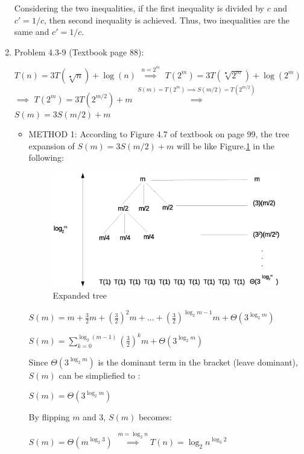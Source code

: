\documentclass[11pt]{article}
\begin{document}
\begin{enumerate}
	Considering the two inequalities, if the first inequality is divided by $c$ and $c{'} = 1/c$, then second inequality is achieved. Thus, two inequalities are the same and $c{'} = 1/c$.  





\pagebreak

\item Problem 4.3-9 (Textbook page 88):
	
	$ T(n) = 3T(\sqrt[•]{n}) + \log(n) $ 
	$ \overset{n=2^m}{\implies} $ 
	$ T(2^m) = 3T(\sqrt[•]{2^m}) + \log(2^m) $ 
	$ \implies $ 
	$T(2^m) = 3T(2^{m/2}) + m $ 
	$ \overset{S(m)=T(2^m) \implies S(m/2)=T(2^{m/2})}{\implies} $ 
	$ S(m) = 3S(m/2) + m$ 
	
	
	\begin{itemize}
    	\item METHOD 1:
     	According to Figure 4.7 of textbook on page 99, the tree expansion of $ S(m) = 3S(m/2) + m$ will be like Figure.\ref{fig:prob2} in the following:
     	
		\begin{figure}[h!]
			\centerline{\includegraphics[width=5in]{prob2.eps}}
			\caption{Expanded tree}
			\label{fig:prob2}
		\end{figure}
	
		$S(m) = m+\frac{3}{2}m+{(\frac{3}{2})}^2m+...+{(\frac{3}{2})}^{\log_2{m-1}}m+\Theta(3^{\log_2{m}})$
		
		$S(m) = \sum_{k=0}^{\log_2{(m-1)}} {(\frac{3}{2})}^k m + \Theta(3^{\log_2{m}})  $
		
		Since $	\Theta(3^{\log_2{m}})  $ is the dominant term in the bracket (leave dominant), $S(m)$ can be simpliefied to :
		
		$S(m) = \Theta(3^{\log_2{m}}) $

		By flipping $m$ and $3$, $S(m)$ becomes:
		
		$S(m) = \Theta(m^{\log_2{3}}) $
		$\overset{m=\log_2{n}}{\implies}T(n)=\log_2{n}^{\log_3{2}}$	
	    

\end{itemize}
\end{enumerate}
\end{document}

